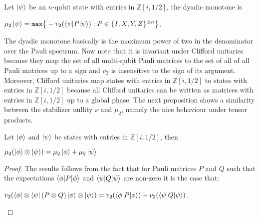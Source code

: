 \documentclass[12pt]{dalthesis}
\begin{document}
%


\begin{definition}
Let $\ket{\psi}$ be an $n$-qubit state with entries in $\mathbb{Z}[i, 1/2]$, the dyadic monotone is 
\begin{center}
$\mu_2 \ket{\psi} = \texttt{max} \big\{-v_2(\braket{\psi | P | \psi}): P \in \{I, X, Y, Z \}^{\otimes n} \big\}$.
\end{center}
\end{definition}
The dyadic monotone basically is the maximum power of two in the denominator over the Pauli spectrum. Now note that it is invariant under Clifford unitaries because they map the set of all multi-qubit Pauli matrices to the set of all of all Pauli matrices up to a sign and $v_2$ is insensitive to the sign of its argument. Moreover, Clifford unitaries map states with entries in $\mathbb{Z}[i, 1/2]$ to states with entries in $\mathbb{Z}[i, 1/2]$ because all Clifford unitaries can be written as matrices with entries in $\mathbb{Z}[i, 1/2]$ up to a global phase. The next proposition shows a similarity between the stabilizer nullity $\nu$ and $\mu_2$, namely the nice behaviour under tensor products.

\begin{proposition}
Let $\ket{\phi}$ and $\ket{\psi}$ be states with entries in $\mathbb{Z}[i, 1/2]$, then 
\begin{center}
$\mu_2 (\ket{\phi} \otimes \ket{\psi}) = \mu_2 \ket{\phi} + \mu_2 \ket{\psi}$
\end{center}
\end{proposition}

\begin{proof}
The results follows from the fact that for Pauli matrices $P$ and $Q$ such that the expectations $\braket{\phi | P |\phi}$ and $\braket{\psi | Q | \psi}$ are non-zero it is the case that:
\begin{center}
$v_2 (\bra{\phi} \otimes \bra{\psi} (P \otimes Q) \ket{\phi} \otimes \ket{\psi}) = v_2 (\braket{\phi | P | \phi}) + v_2(\braket{\psi | Q | \psi})$.
\end{center}
\end{proof}
\end{document}
